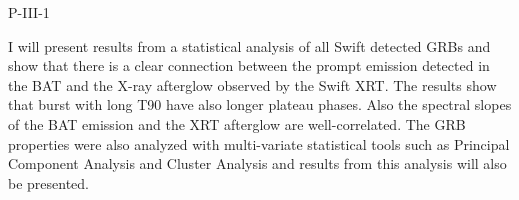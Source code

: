 P-III-1


\bigskip



\bigskip

\noindent I will present results from a statistical analysis of all Swift detected GRBs and show that there is a clear connection between the prompt emission detected in the BAT and the X-ray afterglow observed by the Swift XRT. The results show that burst with long T90 have also longer plateau phases. Also the spectral slopes of the BAT emission and the XRT afterglow are well-correlated. The GRB properties were also analyzed with multi-variate statistical tools such as Principal Component Analysis and Cluster Analysis and results from this analysis will also be presented.
